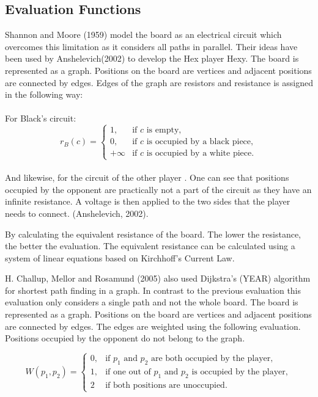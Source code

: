 \documentclass{ba-kecs}
\begin{document}
\subsection{Evaluation Functions}
Shannon and Moore (1959) model the board as an electrical circuit which overcomes this limitation as it considers all paths in parallel. Their ideas have been used by Anshelevich(2002)\cite{anshelevich2002hierarchical} to develop the Hex player Hexy. The board is represented as a graph. Positions on the board are vertices and adjacent positions are connected by edges. Edges of the graph are resistors and resistance is assigned in the following way: 
\\
\\
For Black's circuit:  \\
\begin{equation}
r_B(c)=\begin{cases}
1, & \text{if $c$ is empty},\\
0, & \text{if $c$ is occupied by a black piece},\\
+\infty & \text{if $c$ is occupied by a white piece}.
\end{cases}
\end{equation}
\\
And likewise, for the circuit of the other player . 
One can see that positions occupied by the opponent are practically not a part of the circuit as they have an infinite resistance. A voltage is then applied to the two sides that the player needs to connect. (Anshelevich, 2002)\cite{anshelevich2002hierarchical}.

By calculating the equivalent resistance of the board. The lower the resistance, the better the evaluation. The equivalent resistance can be calculated using a system of linear equations based on Kirchhoff’s Current Law.

H. Challup, Mellor and Rosamund (2005)\cite{chalup2005machine} also used Dijkstra’s (YEAR) algorithm for shortest path finding in a graph. In contrast to the previous evaluation this evaluation only considers a single path and not the whole board.  The board is represented as a graph. Positions on the board are vertices and adjacent positions are connected by edges. The edges are weighted using the following evaluation. Positions occupied by the opponent do not belong to the graph.

\begin{equation}
W(p_1,p_2)=\begin{cases}
0, & \text{if $p_1$  and $p_2$ are both occupied by the player},\\
1, & \text{if one out of $p_1$ and $p_2$  is occupied by the player},\\
2 & \text{if both positions are unoccupied}.
\end{cases}
\end{equation}
\cite{chalup2005machine}
\end{document}
